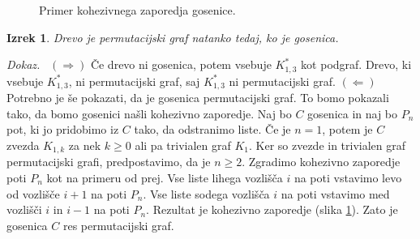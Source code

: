 \documentclass[a4paper, 12pt]{book}
\newtheorem{izrek}{Izrek}[chapter]
\newenvironment{dokaz}{\emph{Dokaz.}\ }{\hspace{\fill}{$\Box$}}
\begin{document}
\begin{figure}[h]
    \begin{center}        
    \end{center}
    \caption{Primer kohezivnega zaporedja gosenice.}
    \label{graf_kohezivnega_zaporedja_gosenice}
\end{figure}
\begin{izrek}
\label{izrek_gosenica_permutacijski_graf}
    Drevo je permutacijski graf natanko tedaj, ko je gosenica.
\end{izrek}
\begin{dokaz}
    $(\Rightarrow)$ Če drevo ni gosenica, potem vsebuje $K_{1,3}^*$ kot podgraf. Drevo, ki vsebuje $K_{1,3}^*$, ni permutacijski graf, saj $K_{1,3}^*$ ni permutacijski graf. $(\Leftarrow)$ Potrebno je še pokazati, da je gosenica permutacijski graf. To bomo pokazali tako, da bomo gosenici našli kohezivno zaporedje. Naj bo $C$ gosenica in naj bo $P_n$ pot, ki jo pridobimo iz $C$ tako, da odstranimo liste. Če je $n=1$, potem je $C$ zvezda $K_{1,k}$ za nek $k \geq 0$ ali pa trivialen graf $K_1$. Ker so zvezde in trivialen graf permutacijski grafi, predpostavimo, da je $n \geq 2$. Zgradimo kohezivno zaporedje poti $P_n$ kot na primeru od prej. Vse liste lihega vozlišča $i$ na poti vstavimo levo od vozlišče $i+1$ na poti $P_n$. Vse liste sodega vozlišča $i$ na poti vstavimo med vozlišči $i$ in $i-1$ na poti $P_n$. Rezultat je kohezivno zaporedje (slika \ref{graf_kohezivnega_zaporedja_gosenice}). Zato je gosenica $C$ res permutacijski graf.    
\end{dokaz}
\end{document}
